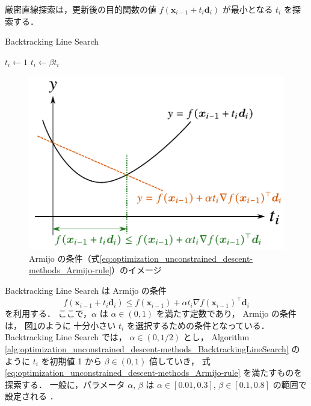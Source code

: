 厳密直線探索は，更新後の目的関数の値
$f(\bm{x}_{i-1} + t_i \bm{d}_i)$
が最小となる $t_i$ を探索する．

\begin{algorithm}[tp]
    \caption{Backtracking Line Search \cite[Section 9.2]{Boyd2004}}
    \label{alg:optimization_unconstrained_descent-methods_BacktrackingLineSearch}
    \begin{algorithmic}
        \State $t_i \gets 1$
        \State $t_i \gets \beta t_i$
        \EndWhile
        \EndProcedure
    \end{algorithmic}
\end{algorithm}

\begin{figure}[tp]
    \centering
    \includegraphics[width=0.7\linewidth]{optimization/Armijo-rule-image.pdf}
    \caption{Armijo の条件（式\eqref{eq:optimization_unconstrained_descent-methods_Armijo-rule}）のイメージ}
    \label{fig:optimization_unconstrained_descent-methods_Armijo-rule-image}
\end{figure}

Backtracking Line Search \cite[Section 9.2]{Boyd2004} は
Armijo の条件 \cite[Section 7.5]{Luenberger2003}
\begin{equation}
    f(\bm{x}_{i-1} + t_i \bm{d}_i) \le f(\bm{x}_{i-1}) + \alpha t_i \nabla f(\bm{x}_{i-1})^\top \bm{d}_i
    \label{eq:optimization_unconstrained_descent-methods_Armijo-rule}
\end{equation}
を利用する．
ここで，$\alpha$ は $\alpha \in (0,1)$ を満たす定数であり，
Armijo の条件は，
図\ref{fig:optimization_unconstrained_descent-methods_Armijo-rule-image}のように
十分小さい $t_i$ を選択するための条件となっている．
Backtracking Line Search では，
$\alpha \in (0, 1/2)$ とし，
Algorithm \ref{alg:optimization_unconstrained_descent-methods_BacktrackingLineSearch}
のように
$t_i$ を初期値 1 から $\beta \in (0, 1)$ 倍していき，
式 \eqref{eq:optimization_unconstrained_descent-methods_Armijo-rule} を満たすものを探索する．
一般に，パラメータ $\alpha$, $\beta$ は
$\alpha \in [0.01, 0.3]$, $\beta \in [0.1, 0.8]$ の範囲で設定される
\cite[Section 9.2]{Boyd2004}．

